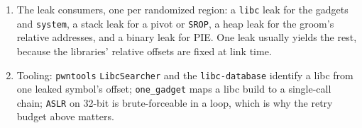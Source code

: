 \documentclass[12pt]{Training}
\begin{document}
\begin{enumerate}
\begin{enumerate}
        \item A stack or \lstinline{environ} pointer: gives the stack base, which is what a \lstinline{SROP} or a stack pivot chain needs.
        \item The binary's own base: a partial pointer or a mapping address (\lstinline{/proc/self/maps} if readable) defeats PIE; on a fully PIE target the leaked \lstinline{libc} address plus the known link-time offset is often enough.
    \end{enumerate}
    \item The leak consumers, one per randomized region: a \lstinline{libc} leak for the gadgets and \lstinline{system}, a stack leak for a pivot or \lstinline{SROP}, a heap leak for the groom's relative addresses, and a binary leak for PIE. One leak usually yields the rest, because the libraries' relative offsets are fixed at link time.
    \item Tooling: \lstinline{pwntools} \lstinline{LibcSearcher} and the \lstinline{libc-database} identify a libc from one leaked symbol's offset; \lstinline{one_gadget} maps a libc build to a single-call chain; \lstinline{ASLR} on 32-bit is brute-forceable in a loop, which is why the retry budget above matters.
\end{enumerate}
\end{document}
